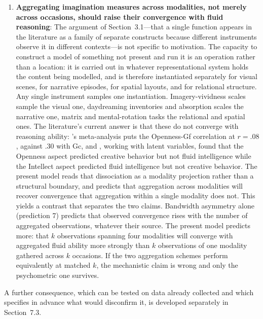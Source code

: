 \documentclass[12pt,a4paper]{article}
\begin{document}
\begin{enumerate}
\item \textbf{Aggregating imagination measures across modalities, not merely across occasions, should raise their convergence with fluid reasoning}: The argument of Section~3.1---\hspace{0pt}that a single function appears in the literature as a family of separate constructs because different instruments observe it in different contexts---\hspace{0pt}is not specific to motivation. The capacity to construct a model of something not present and run it is an operation rather than a location: it is carried out in whatever representational system holds the content being modelled, and is therefore instantiated separately for visual scenes, for narrative episodes, for spatial layouts, and for relational structure. Any single instrument samples one instantiation. Imagery-vividness scales sample the visual one, daydreaming inventories and absorption scales \citep{TellegenAtkinson1974} the narrative one, matrix and mental-rotation tasks the relational and spatial ones. The literature's current answer is that these do not converge with reasoning ability: \citeauthor{AckermanHeggestad1997}'s \citeyearpar{AckermanHeggestad1997} meta-analysis puts the Openness-Gf correlation at $r = .08$, against .30 with Gc, and \citet{NusbaumSilvia2011}, working with latent variables, found that the Openness aspect predicted creative behavior but not fluid intelligence while the Intellect aspect predicted fluid intelligence but not creative behavior. The present model reads that dissociation as a modality projection rather than a structural boundary, and predicts that aggregation across modalities will recover convergence that aggregation within a single modality does not. This yields a contrast that separates the two claims. Bandwidth asymmetry alone (prediction 7) predicts that observed convergence rises with the number of aggregated observations, whatever their source. The present model predicts more: that $k$ observations spanning four modalities will converge with aggregated fluid ability more strongly than $k$ observations of one modality gathered across $k$ occasions. If the two aggregation schemes perform equivalently at matched $k$, the mechanistic claim is wrong and only the psychometric one survives.
\end{enumerate}

A further consequence, which can be tested on data already collected and which specifies in advance what would disconfirm it, is developed separately in Section~7.3.
\end{document}
